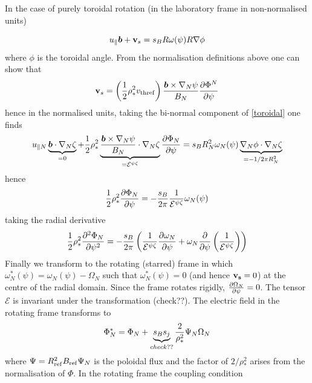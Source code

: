 \documentclass{report}
\renewcommand{\vec}{\bm}
\begin{document}
In the case of purely toroidal rotation (in the laboratory frame in non-normalised units)

\begin{equation}
u_\parallel \vec{b} + {\bf v}_s  = s_B R \omega(\psi) R \nabla \phi
\label{toroidal}
\end{equation}
where $\phi$ is the toroidal angle.  From the normalisation definitions above one can show that
\begin{equation}
 {\bf v}_s = \left({1 \over 2} \rho_*^2 v_{\rm thref}\right) {\vec{b} \times \nabla_N \psi \over
B_N} {\partial \Phi^N \over \partial \psi}
\end{equation}
hence in the normalised units, taking the bi-normal component of \ref{toroidal} one finds
\begin{equation}
 u_{\parallel N} \underbrace{\vec{b} \cdot \nabla_N \zeta}_{=0} +  {1 \over 2}
\rho_*^2 \underbrace{{\vec{b} \times \nabla_N \psi \over B_N}\cdot \nabla_N
\zeta}_{=\mathcal{E}^{\psi \zeta}}{\partial \Phi_N \over \partial \psi} = s_B R_N^2 \omega_N(\psi)
\underbrace{\nabla_N \phi \cdot \nabla_N \zeta}_{=-1/2\pi R_N^2}
\end{equation}
hence
\begin{equation}
 {1 \over 2} \rho_*^2 {\partial \Phi_N \over \partial \psi} = - {s_B \over 2 \pi}{1 \over
\mathcal{E}^{\psi \zeta}}\omega_N(\psi)
\end{equation}
taking the radial derivative
\begin{equation}
 {1 \over 2} \rho_*^2 {\partial^2 \Phi_N \over \partial \psi^2} = - {s_B \over 2 \pi}\left({1 \over
\mathcal{E}^{\psi \zeta}}{\partial \omega_N \over \partial \psi} + \omega_N{\partial \over \partial
\psi} \left({1 \over \mathcal{E}^{\psi \zeta}}\right)\right)
\end{equation}
Finally we transform to the rotating (starred) frame in which
$\omega_N^*(\psi)=\omega_N(\psi)-\Omega_N$ such that $\omega_N^*(\psi)=0$ (and hence ${\bf
v_s}=0$)
at the centre of the radial domain.  Since the frame rotates rigidly, ${\partial \Omega_N \over
\partial \psi}=0$. The tensor $\mathcal{E}$ is invariant under the transformation (check??).  The
electric field in the rotating frame transforms \cite{PEE09} to 
\begin{equation}
\Phi_N^*=\Phi_N + \underbrace{s_B s_j}_{check ??}{2 \over \rho_*^2}\Psi_N \Omega_N 
\end{equation}
where $\Psi = R_{\rm ref}^2 B_{\rm ref}\Psi_N$ is the poloidal flux and the factor of $2 /
\rho_*^2$ arises from the normalisation of $\Phi$.  In the rotating frame the coupling condition
\end{document}
